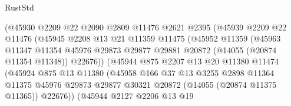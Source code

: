 \begin{lexlean}{RustStd}
\begin{coremodule}
                            (@45930
                              @2209
                              @22
                              @2090
                              @2809
                              @11476
                              @2621
                              @2395
                              (@45939
                                @2209
                                @22
                                @11476
                                (@45945
                                  @2208
                                  @13
                                  @21
                                  @11359
                                  @11475
                                  (@45952
                                    @11359
                                    (@45963
                                      @11347
                                      @11354
                                      @45976
                                      @29873
                                      @29877
                                      @29881
                                      @20872
                                      (@14055 (@20874 @11354 @11348))
                                      @22676))
                                  (@45944
                                    @875
                                    @2207
                                    @13
                                    @20
                                    @11380
                                    @11474
                                    (@45924
                                      @875
                                      @13
                                      @11380
                                      (@45958
                                        @166
                                        @37
                                        @13
                                        @3255
                                        @2898
                                        @11364
                                        @11375
                                        @45976
                                        @29873
                                        @29877
                                        @30321
                                        @20872
                                        (@14055 (@20874 @11375 @11365))
                                        @22676))
                                    (@45944
                                      @2127
                                      @2206
                                      @13
                                      @19

\end{coremodule}
\end{lexlean}
